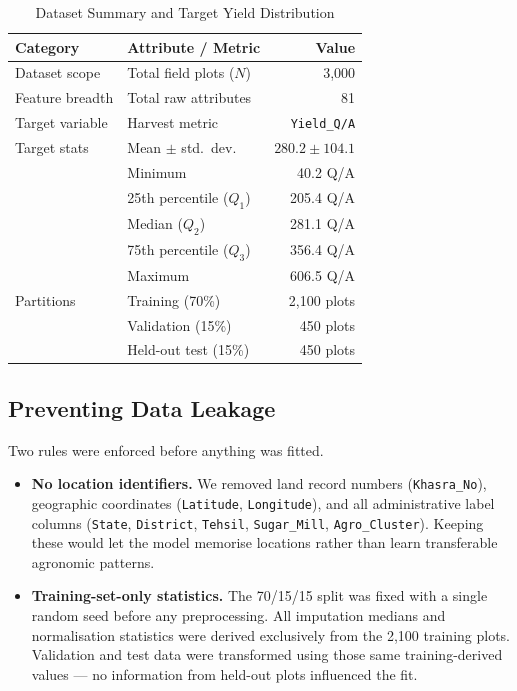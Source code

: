 \documentclass[conference,10pt,letterpaper]{IEEEtran}
\begin{document}
\begin{table}[htbp]
\caption{Dataset Summary and Target Yield Distribution}
\label{tab:dataset_summary}
\centering
\footnotesize
\setlength{\tabcolsep}{4pt}
\begin{tabular*}{\columnwidth}{@{\extracolsep{\fill}}llr@{}}
\toprule
\textbf{Category} & \textbf{Attribute / Metric} & \textbf{Value} \\
\midrule
Dataset scope   & Total field plots ($N$)       & 3,000 \\
Feature breadth & Total raw attributes          & 81 \\
Target variable & Harvest metric                & \texttt{Yield\_Q/A} \\
\midrule
Target stats    & Mean $\pm$ std.\ dev.         & $280.2 \pm 104.1$ \\
                & Minimum                       & 40.2 Q/A \\
                & 25th percentile ($Q_1$)       & 205.4 Q/A \\
                & Median ($Q_2$)                & 281.1 Q/A \\
                & 75th percentile ($Q_3$)       & 356.4 Q/A \\
                & Maximum                       & 606.5 Q/A \\
\midrule
Partitions      & Training (70\%)               & 2,100 plots \\
                & Validation (15\%)             & 450 plots \\
                & Held-out test (15\%)          & 450 plots \\
\bottomrule
\end{tabular*}
\end{table}

\subsection{Preventing Data Leakage}
Two rules were enforced before anything was fitted.
\begin{itemize}
    \item \textbf{No location identifiers.} We removed land record numbers (\texttt{Khasra\_No}), geographic coordinates (\texttt{Latitude}, \texttt{Longitude}), and all administrative label columns (\texttt{State}, \texttt{District}, \texttt{Tehsil}, \texttt{Sugar\_Mill}, \texttt{Agro\_Cluster}). Keeping these would let the model memorise locations rather than learn transferable agronomic patterns.
    \item \textbf{Training-set-only statistics.} The 70/15/15 split was fixed with a single random seed before any preprocessing. All imputation medians and normalisation statistics were derived exclusively from the 2,100 training plots. Validation and test data were transformed using those same training-derived values --- no information from held-out plots influenced the fit.
\end{itemize}
\end{document}
